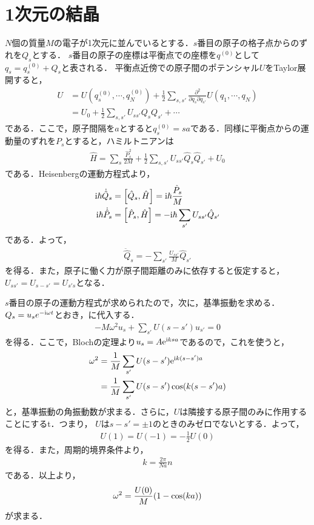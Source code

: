 \documentclass{report}
\begin{document}
\section{1次元の結晶}
$N$個の質量$M$の電子が1次元に並んでいるとする．$s$番目の原子の格子点からのずれを$Q_s$とする．
$s$番目の原子の座標は平衡点での座標を$q^{(0)}$として$q_s = q^{(0)}_s + Q_s$と表される．
平衡点近傍での原子間のポテンシャル$U$をTaylor展開すると，
\begin{align}
  U &= U(q_s^{(0)}, \cdots, q_N^{(0)}) + \frac{1}{2} \sum_{s,s'} \frac{\partial^2}{\partial q_s \partial q_{s'}} U(q_1,\cdots,q_N)\\
  &= U_0 + \frac{1}{2} \sum_{s,s'} U_{ss'} Q_s Q_{s'} + \cdots
\end{align}
である．ここで，原子間隔を$a$とすると$q_s^{(0)} = sa$である．同様に平衡点からの運動量のずれを$P_s$とすると，ハミルトニアンは
\begin{align}
  \hat{H} = \sum_s \frac{\hat{P}_s^2}{2M} + \frac{1}{2} \sum_{s,s'} U_{ss'} \hat{Q}_s \hat{Q}_{s'} + U_0
\end{align}
である．Heisenbergの運動方程式より，
\begin{align}
  \mathrm{i}\hbar  \dot{\hat{Q}}_s &= \qty[\hat{Q}_s,\hat{H}] = \mathrm{i}\hbar\frac{\hat{P}_s}{M}\\
  \mathrm{i}\hbar  \dot{\hat{P}}_s &= \qty[\hat{P}_s,\hat{H}] = -\mathrm{i}\hbar\sum_{s'} U_{ss'} \hat{Q}_{s'}
\end{align}
である．よって，
\begin{align}
  \ddot{\hat{Q}}_s = -\sum_{s'} \frac{U_{ss'}}{M} \hat{Q}_{s'} \label{eom-q}
\end{align}
を得る．また，原子に働く力が原子間距離のみに依存すると仮定すると，$U_{ss'} = U_{s-s'} = U_{s's}$となる．

$s$番目の原子の運動方程式が求められたので，次に，基準振動を求める．$Q_s = u_s e^{-\mathrm{i}\omega t}$とおき，に代入する．
\begin{align}
  -M\omega^2 u_s + \sum_{s'} U(s-s')u_{s'} = 0
\end{align}
を得る．ここで，Blochの定理より$u_s = A\mathrm{e}^{\mathrm{i} ksa}$であるので，これを使うと，
\begin{align}
  \omega^2 &= \frac{1}{M} \sum_{s'} U(s-s') \mathrm{e}^{\mathrm{i} k(s-s')a}\\
  &= \frac{1}{M} \sum_{s'} U(s - s') \cos(k(s-s')a)
\end{align}
と，基準振動の角振動数が求まる．さらに，$U$は隣接する原子間のみに作用することにするt．つまり，
$U$は$s - s' = \pm 1$のときのみゼロでないとする．よって，
\begin{align}
  U(1) = U(-1) = -\frac{1}{2} U(0)
\end{align}
を得る．また，周期的境界条件より，
\begin{align}
  k = \frac{2\pi}{Na}n
\end{align}
である．以上より，
\begin{align}
  \omega^2 = \frac{U(0)}{M} \qty(1 - \cos(ka))
\end{align}
が求まる．
\end{document}
